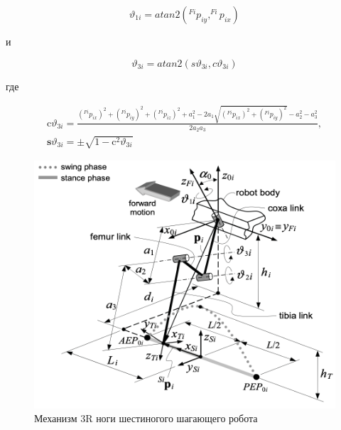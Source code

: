 \begin{equation}
	\vartheta_{1i}=atan2(^{Fi}p_{iy}, ^{Fi}p_{ix}) 
\end{equation}

и

\begin{equation}
	\vartheta_{3i}=atan2(s\vartheta_{3i}, c\vartheta_{3i}) 
\end{equation}

где

\begin{equation}
\begin{array}{l}
	\mathrm{c} \vartheta_{3 i}=\frac{\left(^{F i} p_{i x}\right)^{2}+\left(^{F i} p_{i y}\right)^{2}+\left(^{F i} p_{i z}\right)^{2}+a_{1}^{2}-2 a_{1} \sqrt{\left(^{F i} p_{i x}\right)^{2}+\left(^{F i} p_{i y}\right)^{2}}-a_{2}^{2}-a_{3}^{2}}{2 a_{2} a_{3}},\\
	\mathbf{s} \vartheta_{3 i}=\pm \sqrt{1-\mathrm{c}^{2} \vartheta_{3 i}}
\end{array}
\end{equation}

\begin{figure}[h!]
	\centering
	\includegraphics[]{img/leg_mech}
	\caption{Механизм 3R ноги шестиногого шагающего робота}
	\label{img:leg_mech}
\end{figure}

